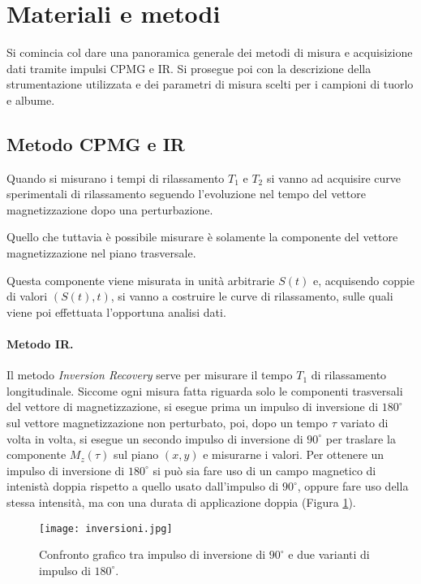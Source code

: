 \section*{Materiali e metodi}

Si comincia col dare una panoramica generale dei metodi di misura e acquisizione dati tramite impulsi CPMG e IR. Si prosegue poi con la descrizione della strumentazione utilizzata e dei parametri di misura scelti per i campioni di tuorlo e albume.

\subsection*{Metodo CPMG e IR}

Quando si misurano i tempi di rilassamento $T_1$ e $T_2$ si vanno ad acquisire curve sperimentali di rilassamento seguendo l'evoluzione nel tempo del vettore magnetizzazione dopo una perturbazione.

Quello che tuttavia è possibile misurare è solamente la componente del vettore magnetizzazione nel piano trasversale.

Questa componente viene misurata in unità arbitrarie $S(t)$ e, acquisendo coppie di valori $(S(t), t)$, si vanno a costruire le curve di rilassamento, sulle quali viene poi effettuata l'opportuna analisi dati.

\paragraph{Metodo IR.}

Il metodo \textit{Inversion Recovery} serve per misurare il tempo $T_1$ di rilassamento longitudinale. Siccome ogni misura fatta riguarda solo le componenti trasversali del vettore di magnetizzazione, si esegue prima un impulso di inversione di $180^{\circ}$ sul vettore magnetizzazione non perturbato, poi, dopo un tempo $\tau$ variato di volta in volta, si esegue un secondo impulso di inversione di $90^{\circ}$ per traslare la componente $M_z(\tau)$ sul piano $(x,y)$ e misurarne i valori. Per ottenere un impulso di inversione di $180^{\circ}$ si può sia fare uso di un campo magnetico di intenistà doppia rispetto a quello usato dall'impulso di $90^{\circ}$, oppure fare uso della stessa intensità, ma con una durata di applicazione doppia (Figura \ref{fig:inversioni}).

\begin{figure}
\centering
\texttt{[image: inversioni.jpg]}
\caption{Confronto grafico tra impulso di inversione di $90^{\circ}$ e due varianti di impulso di $180^{\circ}$.}
\label{fig:inversioni}
\end{figure}  

